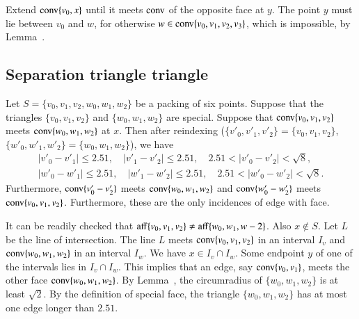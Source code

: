 \begin{tarskidata}
\begin{tarski}
\begin{proved}  Extend ${\operatorname{conv}}\{v_0,x\}$ until it meets
${\operatorname{conv}}$ of the opposite face at $y$.  The point $y$ must lie between
$v_0$ and $w$, for otherwise $w\in{\operatorname{conv}}\{v_0,v_1,v_2,v_3\}$,
which is impossible, by Lemma~.
\swallowed\end{proved}
\end{tarski}







\begin{tarski}
\section{Separation triangle triangle}

\begin{lemma}
Let $S=\{v_0,v_1,v_2,w_0,w_1,w_2\}$ be a packing of six points. 
Suppose that the triangles $\{v_0,v_1,v_2\}$ and $\{w_0,w_1,w_2\}$
are special.  Suppose that ${\operatorname{conv}}\{v_0,v_1,v_2\}$ meets
${\operatorname{conv}}\{w_0,w_1,w_2\}$ at $x$.  Then after reindexing
($\{v'_0,v'_1,v'_2\}=\{v_0,v_1,v_2\}$, $\{w'_0,w'_1,w'_2\} = \{w_0,w_1,w_2\}$),
we have 
   $$
   \begin{array}{lll}
   |v'_0-v'_1|\le 2.51,\quad |v'_1-v'_2|\le 2.51,\quad 2.51 < |v'_0-v'_2|<\sqrt8,\\
   |w'_0-w'_1|\le 2.51,\quad |w'_1-w'_2|\le 2.51,\quad 2.51 < |w'_0-w'_2|<\sqrt8.
   \end{array}
   $$
Furthermore, ${\operatorname{conv}}\{v'_0-v'_2\}$ meets ${\operatorname{conv}}\{w_0,w_1,w_2\}$
and  ${\operatorname{conv}}\{w'_0-w'_2\}$ meets ${\operatorname{conv}}\{v_0,v_1,v_2\}$.
Furthermore, these are the only incidences of edge with face.
\end{lemma}

\begin{proved}
It can be readily checked that ${\operatorname{aff}}\{v_0,v_1,v_2\}\ne
{\operatorname{aff}}\{w_0,w_1,w-2\}$.  Also $x\not\in S$.
Let $L$ be the line of intersection.
The line $L$ meets ${\operatorname{conv}}\{v_0,v_1,v_2\}$ in an interval $I_v$
and ${\operatorname{conv}}\{w_0,w_1,w_2\}$ in an interval $I_w$.  We have
$x\in I_v\cap I_w$.  Some endpoint $y$ of one of the intervals lies
in $I_v\cap I_w$.  This implies that an edge, say ${\operatorname{conv}}\{v_0,v_1\}$,
meets the other face ${\operatorname{conv}}\{w_0,w_1,w_2\}$.  
By Lemma~,
the circumradius of $\{w_0,w_1,w_2\}$ is at least $\sqrt2$.  By
the definition of special face, the triangle $\{w_0,w_1,w_2\}$
has at most one edge longer than $2.51$.


\end{proved}
\end{tarski}
\end{tarskidata}
